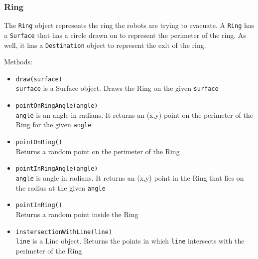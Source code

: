 \documentclass[12pt,letterpaper]{article}
\begin{document}
    \subsubsection{Ring}
        The \texttt{Ring} object represents the ring the robots are trying to evacuate. A \texttt{Ring} has a \texttt{Surface} that has a circle drawn on to represent the perimeter of the ring. As well, it has a \texttt{Destination} object to represent the exit of the ring. 
        \newline
    
        \noindent Methods:
        \begin{itemize}
            \item \texttt{draw(surface)} \\
                \texttt{surface} is a Surface object. Draws the Ring on the given \texttt{surface}
            \item \texttt{pointOnRingAngle(angle)} \\
                \texttt{angle} is an angle in radians. It returns an (x,y) point on the perimeter of the Ring for the given \texttt{angle}
            \item \texttt{pointOnRing()} \\
                Returns a random point on the perimeter of the Ring
            \item \texttt{pointInRingAngle(angle)} \\
                \texttt{angle} is angle in radians. It returns an (x,y) point in the Ring that lies on the radius at the given \texttt{angle}
            \item \texttt{pointInRing()} \\
                Returns a random point inside the Ring
            \item \texttt{instersectionWithLine(line)} \\
                \texttt{line} is a Line object. Returns the points in which \texttt{line} intersects with the perimeter of the Ring
        \end{itemize}

    
\end{document}
